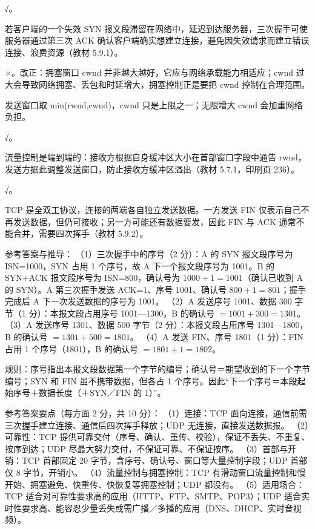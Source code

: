 \documentclass[a4paper,11pt]{article}
\begin{document}
\q √。\begin{analysis}若客户端的一个失效 SYN 报文段滞留在网络中，延迟到达服务器，三次握手可使服务器通过第三次 ACK 确认客户端确实想建立连接，避免因失效请求而建立错误连接、浪费资源（教材 5.9.1）。\end{analysis}

\q ×。改正：拥塞窗口 cwnd 并非越大越好，它应与网络承载能力相适应；cwnd 过大会导致网络拥塞、丢包和时延增大，拥塞控制正是要把 cwnd 控制在合理范围。\begin{analysis}发送窗口取 min(rwnd,cwnd)，cwnd 只是上限之一；无限增大 cwnd 会加重网络负担。\end{analysis}

\q √。\begin{analysis}流量控制是端到端的：接收方根据自身缓冲区大小在首部窗口字段中通告 rwnd，发送方据此调整发送窗口，防止接收方缓冲区溢出（教材 5.7.1，印刷页 236）。\end{analysis}

\q √。\begin{analysis}TCP 是全双工协议，连接的两端各自独立发送数据。一方发送 FIN 仅表示自己不再发送数据，但仍可接收；另一方可能还有数据要发，因此 FIN 与 ACK 通常不能合并，需要四次挥手（教材 5.9.2）。\end{analysis}


\q 参考答案与推导：
（1）三次握手中的序号（2 分）：A 的 SYN 报文段序号为 ISN=1000，SYN 占用 1 个序号，故 A 下一个报文段序号为 1001。B 的 SYN+ACK 报文段序号为 ISN=800，确认号为 $1000+1=1001$（确认已收到 A 的 SYN）。A 第三次握手发送 ACK=1、序号 1001、确认号 $800+1=801$；握手完成后 A 下一次发送数据的序号为 1001。
（2）A 发送序号 1001、数据 300 字节（1 分）：本报文段占用序号 1001—1300，B 的确认号 $=1001+300=1301$。
（3）A 发送序号 1301、数据 500 字节（2 分）：本报文段占用序号 1301—1800，B 的确认号 $=1301+500=1801$。
（4）A 发送 FIN、序号 1801（1 分）：FIN 占用 1 个序号（1801），B 的确认号 $=1801+1=1802$。
\begin{analysis}规则：序号指出本报文段数据第一个字节的编号；确认号＝期望收到的下一个字节编号；SYN 和 FIN 虽不携带数据，但各占 1 个序号。因此“下一个序号＝本段起始序号＋数据长度（＋SYN／FIN 的 1）”。\end{analysis}


\q 参考答案要点（每方面 2 分，共 10 分）：
（1）连接：TCP 面向连接，通信前需三次握手建立连接、通信后四次挥手释放；UDP 无连接，直接发送数据报。
（2）可靠性：TCP 提供可靠交付（序号、确认、重传、校验），保证不丢失、不重复、按序到达；UDP 尽最大努力交付，不保证可靠、不保证按序。
（3）首部与开销：TCP 首部固定 20 字节，含序号、确认号、窗口等大量控制字段；UDP 首部仅 8 字节，开销小。
（4）流量控制与拥塞控制：TCP 有滑动窗口流量控制和慢开始、拥塞避免、快重传、快恢复等拥塞控制；UDP 都没有。
（5）适用场合：TCP 适合对可靠性要求高的应用（HTTP、FTP、SMTP、POP3）；UDP 适合实时性要求高、能容忍少量丢失或需广播／多播的应用（DNS、DHCP、实时音视频）。
\end{document}
